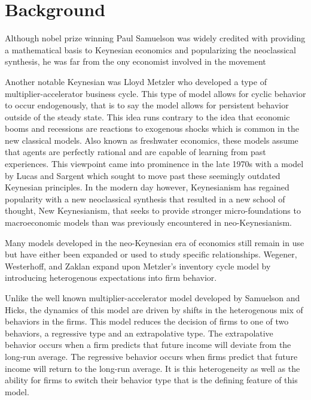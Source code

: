 \section{Background}
Although nobel prize winning Paul Samuelson was widely credited with providing a mathematical basis to Keynesian economics and popularizing the neoclassical synthesis, he was far from the ony economist involved in the movement\autocite{Skousen1997,Samuelson1939}

Another notable Keynesian was Lloyd Metzler who developed a type of multiplier-accelerator business cycle. This type of model allows for cyclic behavior to occur endogenously, that is to say the model allows for persistent behavior outside of the steady state. This idea runs contrary to the idea that economic booms and recessions are reactions to exogenous shocks which is common in the new classical models. Also known as freshwater economics, these models assume that agents are perfectly rational and are capable of learning from past experiences. This viewpoint came into prominence in the late 1970s with a model by Lucas and Sargent\autocite{Lucas1979} which sought to move past these seemingly outdated Keynesian principles. In the modern day however, Keynesianism has regained popularity with a new neoclassical synthesis that resulted in a new school of thought, New Keynesianism, that seeks to provide stronger micro-foundations to macroeconomic models than was previously encountered in neo-Keynesianism. 

Many models developed in the neo-Keynesian era of economics still remain in use but have either been expanded or used to study specific relationships. Wegener, Westerhoff, and Zaklan expand upon Metzler's inventory cycle model by introducing heterogenous expectations into firm behavior\autocite{Wegener2009}. 

Unlike the well known multiplier-accelerator model developed by Samuelson and Hicks, the dynamics of this model are driven by shifts in the heterogenous mix of behaviors in the firms. This model reduces the decision of firms to one of two behaviors, a regressive type and an extrapolative type. The extrapolative behavior occurs when a firm predicts that future income will deviate from the long-run average. The regressive behavior occurs when firms predict that future income will return to the long-run average. It is this heterogeneity as well as the ability for firms to switch their behavior type that is the defining feature of this model. 

